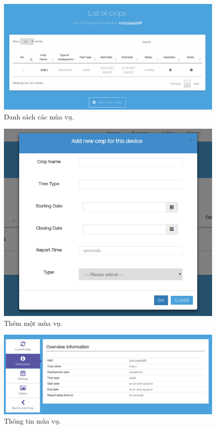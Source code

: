 \documentclass[a4paper,12pt,oneside]{article}
\begin{document}
\begin{center}
\begin{figure}[H]
\centering
\includegraphics[scale=.4]{hinh/web_crop_list.png}
\caption{Danh sách các mùa vụ.}
\end{figure}

\begin{figure}[H]
\centering
\includegraphics[scale=.5]{hinh/web_add_crop.png}
\caption{Thêm một mùa vụ.}
\end{figure}


\begin{figure}[H]
\centering
\includegraphics[scale=.4]{hinh/web_crop_overview.png}
\caption{Thông tin mùa vụ.}
\end{figure}


\end{center}
\end{document}

